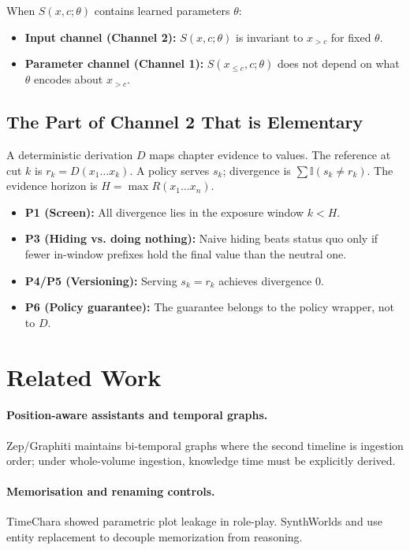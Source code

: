 \documentclass[11pt]{article}
\begin{document}
When $S(x, c; \theta)$ contains learned parameters $\theta$:
\begin{itemize}
    \item \textbf{Input channel (Channel 2):} $S(x, c; \theta)$ is invariant to $x_{>c}$ for fixed $\theta$.
    \item \textbf{Parameter channel (Channel 1):} $S(x_{\le c}, c; \theta)$ does not depend on what $\theta$ encodes about $x_{>c}$.
\end{itemize}

\subsection{The Part of Channel 2 That is Elementary}

A deterministic derivation $D$ maps chapter evidence to values. The reference at cut $k$ is $r_k = D(x_1 \dots x_k)$. A policy serves $s_k$; divergence is $\sum \mathbb{I}(s_k \ne r_k)$. The evidence horizon is $H = \max R(x_1 \dots x_n)$.
\begin{itemize}
    \item \textbf{P1 (Screen):} All divergence lies in the exposure window $k < H$.
    \item \textbf{P3 (Hiding vs. doing nothing):} Naive hiding beats status quo only if fewer in-window prefixes hold the final value than the neutral one.
    \item \textbf{P4/P5 (Versioning):} Serving $s_k = r_k$ achieves divergence 0.
    \item \textbf{P6 (Policy guarantee):} The guarantee belongs to the policy wrapper, not to $D$.
\end{itemize}

\section{Related Work}

\paragraph{Position-aware assistants and temporal graphs.} Zep/Graphiti \citep{zep2025graphiti} maintains bi-temporal graphs where the second timeline is ingestion order; under whole-volume ingestion, knowledge time must be explicitly derived.
\paragraph{Memorisation and renaming controls.} TimeChara \citep{timechara2024} showed parametric plot leakage in role-play. SynthWorlds \citep{synthworlds2026} and \citet{jiang2024memorization} use entity replacement to decouple memorization from reasoning.
\end{document}
